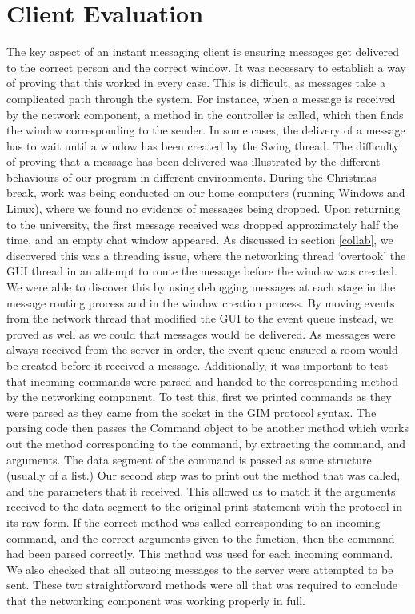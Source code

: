 \section{Client Evaluation}
\label{client_eval}

The key aspect of an instant messaging client is ensuring messages get delivered to the correct person and the correct window. It was necessary to establish a way of proving that this worked in every case. This is difficult, as messages take a complicated path through the system. For instance, when a message is received by the network component, a method in the controller is called, which then finds the window corresponding to the sender. In some cases, the delivery of a message has to wait until a window has been created by the Swing thread. The difficulty of proving that a message has been delivered was illustrated by the different behaviours of our program in different environments. During the Christmas break, work was being conducted on our home computers (running Windows and Linux), where we found no evidence of messages being dropped. Upon returning to the university, the first message received was dropped approximately half the time, and an empty chat window appeared. As discussed in section \ref{collab}, we discovered this was a threading issue, where the networking thread `overtook' the GUI thread in an attempt to route the message before the window was created. We were able to discover this by using debugging messages at each stage in the message routing process and in the window creation process. By moving events from the network thread that modified the GUI to the event queue instead, we proved as well as we could that messages would be delivered. As messages were always received from the server in order, the event queue ensured a room would be created before it received a message. 
Additionally, it was important to test that incoming commands were parsed and handed to the corresponding method by the networking component. To test this, first we printed commands as they were parsed as they came from the socket in the GIM protocol syntax. The parsing code then passes the Command object to be another method which works out the method corresponding to the command, by extracting the command, and arguments. The data segment of the command is passed as some structure (usually of a list.) Our second step was to print out the method that was called, and the parameters that it received. This allowed us to match it the arguments received to the data segment to the original print statement with the protocol in its raw form. If the correct method was called corresponding to an incoming command, and the correct arguments given to the function, then the command had been parsed correctly. This method was used for each incoming command. We also checked that all outgoing messages to the server were attempted to be sent. These two straightforward methods were all that was required to conclude that the networking component was working properly in full.

